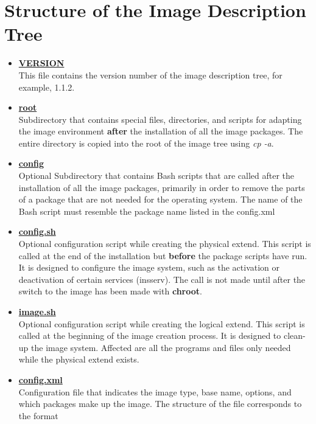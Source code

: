 \section{Structure of the Image Description Tree}
\label{imagetree}
\begin{itemize}

\item \textbf{\underline{VERSION}}\\
      This file contains the version number of the image description tree,
      for example, 1.1.2.
\item \textbf{\underline{root}}\\
      Subdirectory that contains special files, directories, and scripts for
      adapting the image environment \textbf{after} the installation of all the
      image packages. The entire directory is copied into the root of the
      image tree using \textit{cp -a}.
\item \textbf{\underline{config}}\\
      Optional Subdirectory that contains Bash scripts that are called
      after the installation of all the image packages, primarily in order
      to remove the parts of a package that are not needed for the operating
      system. The name of the Bash script must resemble the package name
      listed in the config.xml
\item \textbf{\underline{config.sh}}\\
      Optional configuration script while creating the physical extend. This
      script is called at the end of the installation but \textbf{before}
      the package scripts have run. It is designed to configure the image
      system, such as the activation or deactivation of certain services
      (insserv). The call is not made until after the switch to the image
      has been made with \textbf{chroot}.
\item \textbf{\underline{image.sh}}\\
      Optional configuration script while creating the logical extend.
      This script is called at the beginning of the image creation process.
      It is designed to clean-up the image system. Affected are all the
      programs and files only needed while the physical extend exists.
\item \textbf{\underline{config.xml}}\\
      Configuration file that indicates the image type, base name,
      options, and which packages make up the image. The structure of the
	  file corresponds to the format


\end{itemize}
